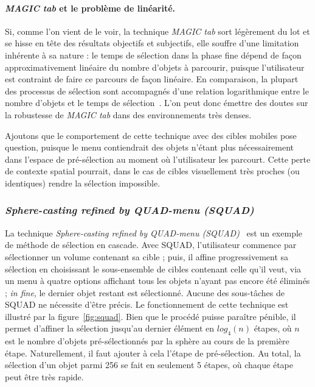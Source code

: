 	\paragraph{\emph{MAGIC tab} et le problème de linéarité.}
	Si, comme l'on vient de le voir, la technique \emph{MAGIC tab} sort légèrement du lot et se hisse en tête des résultats objectifs et subjectifs, elle souffre d'une limitation inhérente à sa nature : le temps de sélection dans la phase fine dépend de façon approximativement linéaire du nombre d'objets à parcourir, puisque l'utilisateur est contraint de faire ce parcours de façon linéaire. En comparaison, la plupart des processus de sélection sont accompagnés d'une relation logarithmique entre le nombre d'objets et le temps de sélection~\cite{hick1952rate, hyman1953stimulus}. L'on peut donc émettre des doutes sur la robustesse de \emph{MAGIC tab} dans des environnements très denses.
	
	Ajoutons que le comportement de cette technique avec des cibles mobiles pose question, puisque le menu contiendrait des objets n'étant plus nécessairement dans l'espace de pré-sélection au moment où l'utilisateur les parcourt. Cette perte de contexte spatial pourrait, dans le cas de cibles visuellement très proches (ou identiques) rendre la sélection impossible.
	
	\subsubsection{\emph{Sphere-casting refined by QUAD-menu
(SQUAD)}}
	La technique \emph{Sphere-casting refined by QUAD-menu
(SQUAD)}~\cite{kopper2011rapid} est un exemple de méthode de sélection en cascade. Avec SQUAD, l'utilisateur commence par sélectionner un volume contenant sa cible ; puis, il affine progressivement sa sélection en choisissant le sous-ensemble de cibles contenant celle qu'il veut, via un menu à quatre options affichant tous les objets n'ayant pas encore été éliminés ; \emph{in fine}, le dernier objet restant est sélectionné. Aucune des sous-tâches de SQUAD ne nécessite d'être précis. Le fonctionnement de cette technique est illustré par la figure~\ref{fig:squad}. Bien que le procédé puisse paraître pénible, il permet d'affiner la sélection jusqu'au dernier élément en $log_{4}(n)$ étapes, où $n$ est le nombre d'objets pré-sélectionnés par la sphère au cours de la première étape. Naturellement, il faut ajouter à cela l'étape de pré-sélection. Au total, la sélection d'un objet parmi 256 se fait en seulement 5 étapes, où chaque étape peut être très rapide.
	
